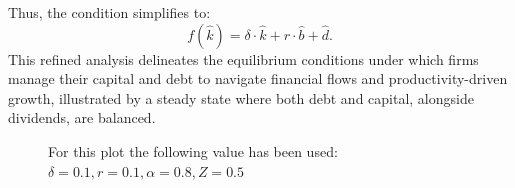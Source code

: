 \documentclass[12pt]{article}
\begin{document}
Thus, the condition simplifies to:
\[f(\widehat{k}) = \delta \cdot \widehat{k} + r \cdot \widehat{b} + \widehat{d}.\]
This refined analysis delineates the equilibrium conditions under which firms manage their capital and debt to navigate
financial flows and productivity-driven growth, illustrated by a steady state where both debt and capital, alongside
dividends, are balanced. 
\begin{figure}
    \centering
    
    \caption{For this plot the following value has been used: \(\delta =0.1, r=0.1, \alpha=0.8, Z=0.5\)}
\end{figure}
\end{document}

